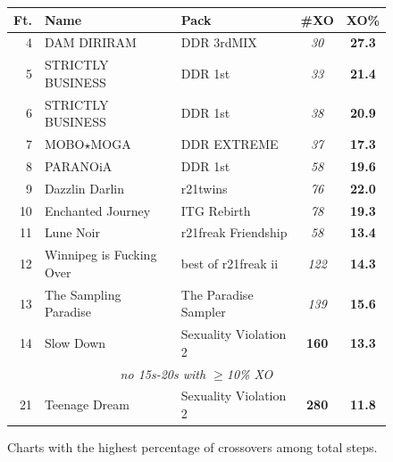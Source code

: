 \documentclass[10pt]{sigplanconf}
\begin{document}
\begin{figure}[t]
	\begin{center}
		\small
	\begin{tabular}{r|l|l|c|c}
		\bf Ft. & \bf Name & \bf Pack & \bf \#XO & \bf XO\% \\
		\hline
		 4 & DAM DIRIRAM              & DDR 3rdMIX            & \em  30 & \bf 27.3 \\
		 5 & STRICTLY BUSINESS        & DDR 1st               & \em  33 & \bf 21.4 \\
		 6 & STRICTLY BUSINESS        & DDR 1st               & \em  38 & \bf 20.9 \\
		 7 & MOBO$\star$MOGA          & DDR EXTREME           & \em  37 & \bf 17.3 \\
		 8 & PARANOiA                 & DDR 1st               & \em  58 & \bf 19.6 \\
		 9 & Dazzlin Darlin           & r21twins              & \em  76 & \bf 22.0 \\
		10 & Enchanted Journey        & ITG Rebirth           & \em  78 & \bf 19.3 \\
		11 & Lune Noir                & r21freak Friendship   & \em  58 & \bf 13.4 \\
		12 & Winnipeg is Fucking Over & best of r21freak ii   & \em 122 & \bf 14.3 \\
		13 & The Sampling Paradise    & The Paradise Sampler  & \em 139 & \bf 15.6 \\
		14 & Slow Down                & Sexuality Violation 2 & \bf 160 & \bf 13.3 \\
		\multicolumn{5}{c}{\em no 15s-20s with $\ge$10\% XO} \\
		21 & Teenage Dream            & Sexuality Violation 2 & \bf 280 & \bf 11.8 \\
	\end{tabular}
	\end{center}
	\caption{Charts with the highest percentage of crossovers among total steps.}
\end{figure}
\end{document}
